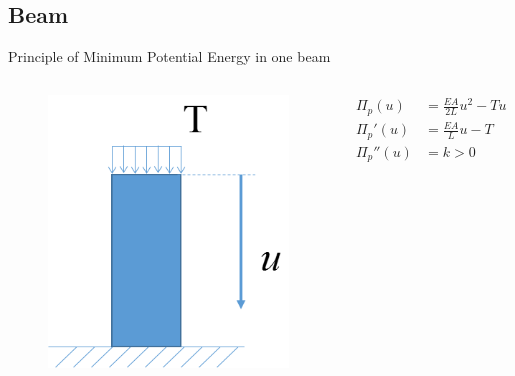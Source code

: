 \documentclass[11pt]{beamer}
\begin{document}
\subsection{Beam}
\begin{frame}{Principle of Minimum Potential Energy in one beam}
\begin{columns}
\begin{figure}
\centering
\includegraphics[width=0.6\linewidth]{source/simple_elastic_body}
\end{figure}
\begin{block}{}
\begin{align*}
\Pi_p(u)&= \frac{EA}{2L}u^2-Tu\\
\Pi_p'(u)&= \frac{EA}{L}u-T \\
\Pi_p''(u)&= k>0
\end{align*}
\end{block}
\end{columns}
\end{frame}
\end{document}
